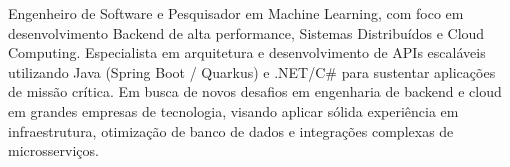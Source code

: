 Engenheiro de Software e Pesquisador em Machine Learning, com foco em desenvolvimento Backend de alta performance, Sistemas Distribuídos e Cloud Computing. %
Especialista em arquitetura e desenvolvimento de APIs escaláveis utilizando Java (Spring Boot / Quarkus) e .NET/C\# para sustentar aplicações de missão crítica. %
Em busca de novos desafios em engenharia de backend e cloud em grandes empresas de tecnologia, visando aplicar sólida experiência em infraestrutura, otimização de banco de dados e integrações complexas de microsserviços.
